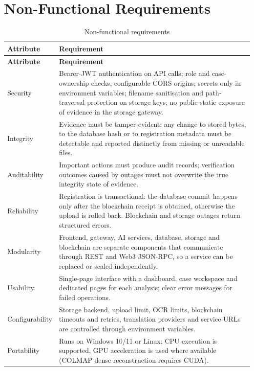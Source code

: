 \documentclass[12pt,a4paper,oneside]{report}
\begin{document}
\section{Non-Functional Requirements}
{\footnotesize
\setlength{\tabcolsep}{3pt}
\renewcommand{\arraystretch}{1.15}
\begin{longtable}{|>{\raggedright\arraybackslash}p{2.84cm}|>{\raggedright\arraybackslash}p{11.36cm}|}
\caption{Non-functional requirements}\\
\hline
\rowcolor{headfill}\textbf{Attribute} & \textbf{Requirement} \\ \hline
\endfirsthead
\hline
\rowcolor{headfill}\textbf{Attribute} & \textbf{Requirement} \\ \hline
\endhead
\hline \endfoot
Security & Bearer-JWT authentication on API calls; role and case-ownership checks; configurable CORS origins; secrets only in environment variables; filename sanitisation and path-traversal protection on storage keys; no public static exposure of evidence in the storage gateway. \\ \hline
Integrity & Evidence must be tamper-evident: any change to stored bytes, to the database hash or to registration metadata must be detectable and reported distinctly from missing or unreadable files. \\ \hline
Auditability & Important actions must produce audit records; verification outcomes caused by outages must not overwrite the true integrity state of evidence. \\ \hline
Reliability & Registration is transactional: the database commit happens only after the blockchain receipt is obtained, otherwise the upload is rolled back. Blockchain and storage outages return structured errors. \\ \hline
Modularity & Frontend, gateway, AI services, database, storage and blockchain are separate components that communicate through REST and Web3 JSON-RPC, so a service can be replaced or scaled independently. \\ \hline
Usability & Single-page interface with a dashboard, case workspace and dedicated pages for each analysis; clear error messages for failed operations. \\ \hline
Configurability & Storage backend, upload limit, OCR limits, blockchain timeouts and retries, translation providers and service URLs are controlled through environment variables. \\ \hline
Portability & Runs on Windows 10/11 or Linux; CPU execution is supported, GPU acceleration is used where available (COLMAP dense reconstruction requires CUDA). \\ \hline
\end{longtable}
}
\end{document}
